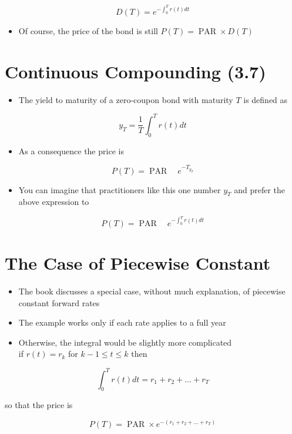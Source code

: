 \documentclass[letterpaper]{article}
\begin{document}
$$
D(T)=e^{-\int_{0}^{T} r(t) d t}
$$

\begin{itemize}
  \item Of course, the price of the bond is still $P(T)=\operatorname{PAR} \times D(T)$
\end{itemize}

\section*{Continuous Compounding (3.7)}
\begin{itemize}
  \item The yield to maturity of a zero-coupon bond with maturity $T$ is defined as
\end{itemize}

$$
y_{T}=\frac{1}{T} \int_{0}^{T} r(t) d t
$$

\begin{itemize}
  \item As a consequence the price is
\end{itemize}

$$
P(T)=\operatorname{PAR} \quad e^{-T_{y_{T}}}
$$

\begin{itemize}
  \item You can imagine that practitioners like this one number $y_{T}$ and prefer the above expression to
\end{itemize}

$$
P(T)=\operatorname{PAR} \quad e^{-\int_{0}^{T} r(t) d t}
$$

\section*{The Case of Piecewise Constant}
\begin{itemize}
  \item The book discusses a special case, without much explanation, of piecewise constant forward rates
  \item The example works only if each rate applies to a full year
  \item Otherwise, the integral would be slightly more complicated\\
if $r(t)=r_{k}$ for $k-1 \leq t \leq k$ then
\end{itemize}

$$
\int_{0}^{T} r(t) d t=r_{1}+r_{2}+\ldots+r_{T}
$$

so that the price is

$$
P(T)=\operatorname{PAR} \times e^{-\left(r_{1}+r_{2}+\ldots+r_{T}\right)}
$$
\end{document}
